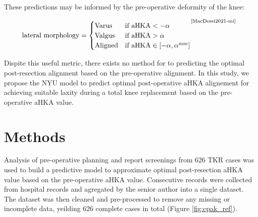 \documentclass{article}
\begin{document}
These predictions may be informed by the pre-operative deformity of the knee:

\[\text{lateral morphology}=
	\begin{cases}
		\text{Varus} & \text{if } \text{aHKA} < -\alpha \\
		\text{Valgus} & \text{if } \text{aHKA} > \alpha \\
		\text{Aligned} & \text{if } \text{aHKA} \in [-\alpha, \alpha^\text{mm}]
	\end{cases} ^ \text{\cite{MacDessi2021-mi}}
\]

Dispite this useful metric, there exists no method for to predicting the optimal post-resection alignment based on the pre-operative alignment.
In this study, we propose the NYU model to predict optimal post-operative aHKA alignement 
for achieving suitable laxity during a total knee replacement based on the pre-operative aHKA value.

\section{Methods}

Analysis of pre-operative planning and report screenings from 626 TKR cases was used to build a predictive model
to approximate optimal post-resection aHKA value based on the pre-operative aHKA value.
Consecutive records were collected from hospital records and agregated by the senior author into a single dataset.
The dataset was then cleaned and pre-processed to remove any missing or incomplete data, yeilding 626 complete cases in total (Figure \ref{fig:cpak_ref}).
\end{document}
